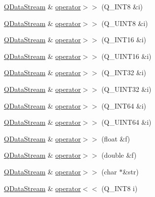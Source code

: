 \begin{DoxyCompactItemize}
\item 
\mbox{\hyperlink{class_q_data_stream}{Q\+Data\+Stream}} \& \mbox{\hyperlink{class_q_data_stream_aebb5fe86181c3a74f7b6c0fa95c10bb0}{operator$>$$>$}} (Q\+\_\+\+I\+N\+T8 \&i)
\item 
\mbox{\hyperlink{class_q_data_stream}{Q\+Data\+Stream}} \& \mbox{\hyperlink{class_q_data_stream_a52e7c242ac64bc58936f537a3b53aced}{operator$>$$>$}} (Q\+\_\+\+U\+I\+N\+T8 \&i)
\item 
\mbox{\hyperlink{class_q_data_stream}{Q\+Data\+Stream}} \& \mbox{\hyperlink{class_q_data_stream_a6e54a73d831ec308b04b1c11fcb28f17}{operator$>$$>$}} (Q\+\_\+\+I\+N\+T16 \&i)
\item 
\mbox{\hyperlink{class_q_data_stream}{Q\+Data\+Stream}} \& \mbox{\hyperlink{class_q_data_stream_a9074e93a86770cb900c817178ab5d166}{operator$>$$>$}} (Q\+\_\+\+U\+I\+N\+T16 \&i)
\item 
\mbox{\hyperlink{class_q_data_stream}{Q\+Data\+Stream}} \& \mbox{\hyperlink{class_q_data_stream_ad3d2f16864f5457f9bf67279d6017980}{operator$>$$>$}} (Q\+\_\+\+I\+N\+T32 \&i)
\item 
\mbox{\hyperlink{class_q_data_stream}{Q\+Data\+Stream}} \& \mbox{\hyperlink{class_q_data_stream_a56a4cf0d69f504a02e3a4f6518324036}{operator$>$$>$}} (Q\+\_\+\+U\+I\+N\+T32 \&i)
\item 
\mbox{\hyperlink{class_q_data_stream}{Q\+Data\+Stream}} \& \mbox{\hyperlink{class_q_data_stream_a9e3bb76fb6ff57fbc375734621f965d0}{operator$>$$>$}} (Q\+\_\+\+I\+N\+T64 \&i)
\item 
\mbox{\hyperlink{class_q_data_stream}{Q\+Data\+Stream}} \& \mbox{\hyperlink{class_q_data_stream_a6b229aa34e28f6623cb6e30666736058}{operator$>$$>$}} (Q\+\_\+\+U\+I\+N\+T64 \&i)
\item 
\mbox{\hyperlink{class_q_data_stream}{Q\+Data\+Stream}} \& \mbox{\hyperlink{class_q_data_stream_a91a008aea3483414151f12f5c7090d28}{operator$>$$>$}} (float \&f)
\item 
\mbox{\hyperlink{class_q_data_stream}{Q\+Data\+Stream}} \& \mbox{\hyperlink{class_q_data_stream_a104e26e0d013188f9cc91d232d70d7f0}{operator$>$$>$}} (double \&f)
\item 
\mbox{\hyperlink{class_q_data_stream}{Q\+Data\+Stream}} \& \mbox{\hyperlink{class_q_data_stream_a50d7a4dfbb348b1f48a88853b0a8c340}{operator$>$$>$}} (char $\ast$\&str)
\item 
\mbox{\hyperlink{class_q_data_stream}{Q\+Data\+Stream}} \& \mbox{\hyperlink{class_q_data_stream_acfee699863f4dfd77304a28fb0f777b0}{operator$<$$<$}} (Q\+\_\+\+I\+N\+T8 i)

\end{DoxyCompactItemize}
